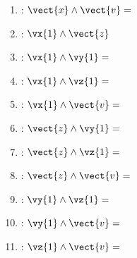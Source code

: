 \begin{corrigebox}
\begin{enumerate}
\item : $\vect{x}\wedge\vect{v} = $
\item : $\vx{1}\wedge\vect{z}$
\item : $\vx{1}\wedge\vy{1} = $
\item : $\vx{1}\wedge\vz{1} = $
\item : $\vx{1}\wedge\vect{v} = $
\item : $\vect{z}\wedge\vy{1} = $
\item : $\vect{z}\wedge\vz{1} = $
\item : $\vect{z}\wedge\vect{v} = $
\item : $\vy{1}\wedge\vz{1} = $
\item : $\vy{1}\wedge\vect{v} = $
\item : $\vz{1}\wedge\vect{v} = $
\end{enumerate}
\end{corrigebox}
